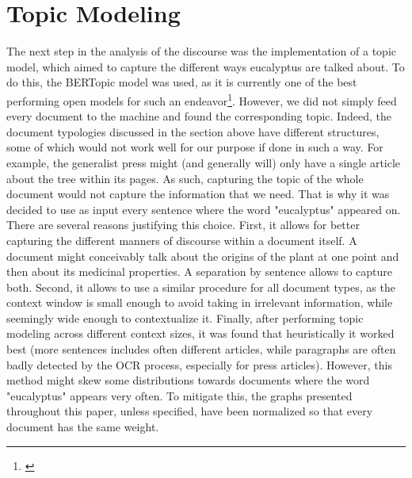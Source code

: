 \section{Topic Modeling}
\label{sec:met_topic_modeling}

The next step in the analysis of the discourse was the implementation of a topic model, which aimed to capture the different ways eucalyptus are talked about. To do this, the BERTopic model was used, as it is currently one of the best performing open models for such an endeavor\footnote{\cite{grootendorst_bertopic_2022}}. However, we did not simply feed every document to the machine and found the corresponding topic. Indeed, the document typologies discussed in the section above have different structures, some of which would not work well for our purpose if done in such a way. For example, the generalist press might (and generally will) only have a single article about the tree within its pages. As such, capturing the topic of the whole document would not capture the information that we need. That is why it was decided to use as input every sentence where the word "eucalyptus" appeared on. There are several reasons justifying this choice. First, it allows for better capturing the different manners of discourse within a document itself. A document might conceivably talk about the origins of the plant at one point and then about its medicinal properties. A separation by sentence allows to capture both. Second, it allows to use a similar procedure for all document types, as the context window is small enough to avoid taking in irrelevant information, while seemingly wide enough to contextualize it. Finally, after performing topic modeling across different context sizes, it was found that heuristically it worked best (more sentences includes often different articles, while paragraphs are often badly detected by the OCR process, especially for press articles). However, this method might skew some distributions towards documents where the word "eucalyptus" appears very often. To mitigate this, the graphs presented throughout this paper, unless specified, have been normalized so that every document has the same weight.

